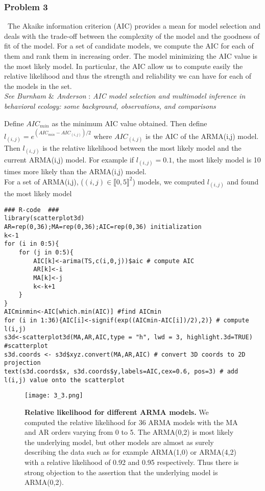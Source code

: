 \documentclass{article}
\begin{document}
\subsubsection*{Problem 3}
\
The Akaike information criterion (AIC) provides a mean for model selection and deals with the trade-off between the complexity of the model and the goodness of fit of the model. For a set of candidate models, we compute the AIC for each of them and rank them in increasing order. The model minimizing the AIC value is the most likely model. In particular, the AIC allow us to compute easily the relative likelihood and thus the strength and reliability we can have for each of the models in the set. \\
\textit{See Burnham $\&$ Anderson} : \emph{AIC model selection and multimodel inference in behavioral ecology: some background, observations, and comparisons}

Define $AIC_{min}$ as the minimum AIC value obtained. Then define $l_{(i,j)}=e^{(AIC_{min}-AIC_{(i,j)})/2}$ where $AIC_{(i,j)}$ is the AIC of the ARMA(i,j) model. Then $l_{(i,j)}$ is the relative likelihood between the most likely model and the current ARMA(i,j) model. For example if $l_{(i,j)}=0.1$, the most likely model is 10 times more likely than the ARMA(i,j) model.  \\

For a set of ARMA(i,j), ($(i,j) \in \llbracket 0,5 \rrbracket^2$) models, we computed $l_{(i,j)}$ and found the most likely model 
\newpage
\begin{verbatim}
### R-code  ###
library(scatterplot3d) 
AR=rep(0,36);MA=rep(0,36);AIC=rep(0,36) initialization
k<-1
for (i in 0:5){
	for (j in 0:5){
		AIC[k]<-arima(TS,c(i,0,j))$aic # compute AIC
		AR[k]<-i
		MA[k]<-j
		k<-k+1
	}
}
AICminmin<-AIC[which.min(AIC)] #find AICmin
for (i in 1:36){AIC[i]<-signif(exp((AICmin-AIC[i])/2),2)} # compute l(i,j)
s3d<-scatterplot3d(MA,AR,AIC,type = "h", lwd = 3, highlight.3d=TRUE) #scatterplot
s3d.coords <- s3d$xyz.convert(MA,AR,AIC) # convert 3D coords to 2D projection
text(s3d.coords$x, s3d.coords$y,labels=AIC,cex=0.6, pos=3) # add l(i,j) value onto the scatterplot
\end{verbatim}
\begin{figure}[H]
	\centering
  	\texttt{[image: 3\_3.png]}
  	\caption{\textbf{Relative likelihood for different ARMA models.} We computed the relative likelihood for 36 ARMA models with the MA and AR orders varying from 0 to 5. The ARMA(0,2) is most likely the underlying model, but other models are almost as surely describing the data such as for example ARMA(1,0) or ARMA(4,2) with a relative likelihood of 0.92 and 0.95 respectively. Thus there is strong objection to the assertion that the underlying model is ARMA(0,2).}
\end{figure}
\end{document}
